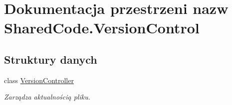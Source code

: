 \hypertarget{a00318}{}\section{Dokumentacja przestrzeni nazw Shared\+Code.\+Version\+Control}
\label{a00318}
\subsection*{Struktury danych}
\begin{DoxyCompactItemize}
\item 
class \hyperlink{a00081}{Version\+Controller}
\begin{DoxyCompactList}\small\item\em Zarządza aktualnością pliku. \end{DoxyCompactList}\end{DoxyCompactItemize}
